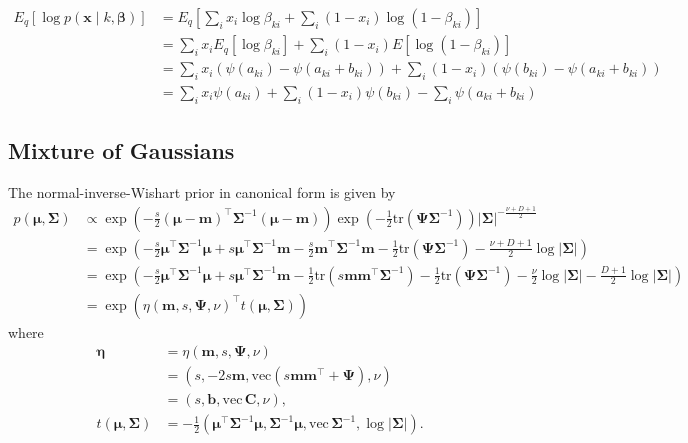 \documentclass[a4paper]{article}
\begin{document}
			\begin{align}
				E_q\left[ \log p(\mathbf{x} \mid k, \bm{\beta}) \right]
				&= E_q\left[ \sum_i x_i \log \beta_{ki} + \sum_i (1 - x_i) \log (1 - \beta_{ki}) \right] \\
				&= \sum_i x_i E_q\left[ \log \beta_{ki} \right] + \sum_i (1 - x_i) E\left[ \log (1 - \beta_{ki})  \right] \\
				&= \sum_i x_i \left( \psi(a_{ki}) - \psi(a_{ki} + b_{ki}) \right) + \sum_i (1 - x_i) \left( \psi(b_{ki}) - \psi(a_{ki} + b_{ki}) \right) \\
				&= \sum_i x_i \psi(a_{ki}) + \sum_i (1 - x_i) \psi(b_{ki}) - \sum_i \psi(a_{ki} + b_{ki})
			\end{align}

		\subsection*{Mixture of Gaussians}
			The normal-inverse-Wishart prior in canonical form is given by
			\begin{align}
				p(\bm{\mu}, \bm{\Sigma})
					&\propto \exp\left( -\frac{s}{2} (\bm{\mu} - \mathbf{m})^\top \bm{\Sigma}^{-1} (\bm{\mu} - \mathbf{m}) \right) 
					\exp\left( -\frac{1}{2} \text{tr}(\bm{\Psi}\bm{\Sigma}^{-1}) \right) |\bm{\Sigma}|^{-\frac{\nu + D + 1}{2}} \\
					&= \exp\left( -\frac{s}{2} \bm{\mu}^\top \bm{\Sigma}^{-1} \bm{\mu} + s \bm{\mu}^\top \bm{\Sigma}^{-1} \mathbf{m}
					- \frac{s}{2} \mathbf{m}^\top\bm{\Sigma}^{-1}\mathbf{m} - \frac{1}{2} \text{tr}(\bm{\Psi}\bm{\Sigma}^{-1})
					- \frac{\nu + D + 1}{2} \log |\bm{\Sigma}| \right) \\
				&= \exp\left( -\frac{s}{2} \bm{\mu}^\top \bm{\Sigma}^{-1} \bm{\mu} + s \bm{\mu}^\top \bm{\Sigma}^{-1} \mathbf{m}
					- \frac{1}{2} \text{tr}(s\mathbf{m}\mathbf{m}^\top\bm{\Sigma}^{-1}) - \frac{1}{2} \text{tr}(\bm{\Psi}\bm{\Sigma}^{-1})
					- \frac{\nu}{2} \log |\bm{\Sigma}| - \frac{D + 1}{2} \log |\bm{\Sigma}| \right) \\
				&= \exp\left( \eta(\mathbf{m}, s, \bm{\Psi}, \nu)^\top t(\bm{\mu}, \bm{\Sigma}) \right)
			\end{align}
			where
			\begin{align}
				\bm{\eta} 
					&= \eta(\mathbf{m}, s, \bm{\Psi}, \nu) \\
					&= \left( s, -2s\mathbf{m}, \text{vec}(s\mathbf{m}\mathbf{m}^\top + \bm{\Psi}), \nu \right) \\
					&= \left( s, \mathbf{b}, \text{vec}\, \mathbf{C}, \nu \right), \\
				t(\bm{\mu}, \bm{\Sigma})
					&= -\frac{1}{2} \left( \bm{\mu}^\top \bm{\Sigma}^{-1} \bm{\mu}, \bm{\Sigma}^{-1}\bm{\mu}, \text{vec}\, \bm{\Sigma}^{-1}, \log|\bm{\Sigma}| \right).
			\end{align}
\end{document}
